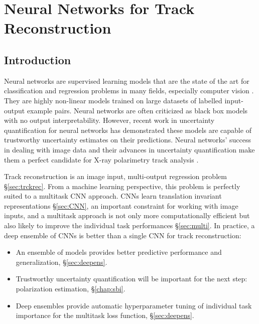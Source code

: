 \chapter{Neural Networks for Track Reconstruction}
\label{chap:nn}

\section{Introduction}
Neural networks are supervised learning models that are the state of the art for classification and regression problems in many fields, especially computer vision \citep{mahony_deep_2020}. They are highly non-linear models trained on large datasets of labelled input-output example pairs. Neural networks are often criticized as black box models with no output interpretability. However, recent work in uncertainty quantification for neural networks \citep{abdar_review_2021} has demonstrated these models are capable of trustworthy uncertainty estimates on their predictions. Neural networks' success in dealing with image data and their advances in uncertainty quantification make them a perfect candidate for X-ray polarimetry track analysis \citep{kitaguchi_convolutional_2019, peirson_deep_2021}.

Track reconstruction is an image input, multi-output regression problem \S\ref{sec:trckrec}. From a machine learning perspective, this problem is perfectly suited to a multitask CNN approach. CNNs learn translation invariant representations \S\ref{sec:CNN}, an important constraint for working with image inputs, and a multitask approach is not only more computationally efficient but also likely to improve the individual task performances \S\ref{sec:multi}. In practice, a deep ensemble of CNNs is better than a single CNN for track reconstruction:
\begin{itemize}
    \item An ensemble of models provides better predictive performance and generalization, \S\ref{sec:deepens}.
    \item Trustworthy uncertainty quantification will be important for the next step: polarization estimation, \S\ref{chap:sbi}.
    \item Deep ensembles provide automatic hyperparameter tuning of individual task importance for the multitask loss function, \S\ref{sec:deepens}.
\end{itemize}

